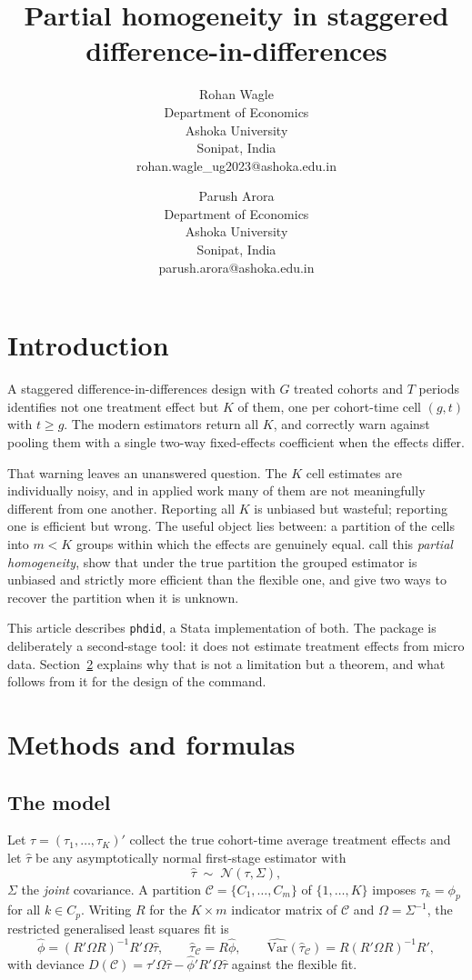 \documentclass{sj}
\title[phdid: Partial homogeneity in staggered DiD]{Partial homogeneity in
staggered difference-in-differences}
\author{Rohan Wagle\\Department of Economics\\Ashoka University\\Sonipat,
India\\rohan.wagle\_ug2023@ashoka.edu.in
\and Parush Arora\\Department of Economics\\Ashoka University\\Sonipat,
India\\parush.arora@ashoka.edu.in}
\begin{document}
\maketitle

\section{Introduction}

A staggered difference-in-differences design with $G$ treated cohorts and $T$
periods identifies not one treatment effect but $K$ of them, one per
cohort-time cell $(g,t)$ with $t \ge g$.  The modern estimators
\citep{CallawaySantAnna2021,Wooldridge2025} return all $K$, and correctly
warn against pooling them with a single two-way fixed-effects coefficient when
the effects differ.

That warning leaves an unanswered question.  The $K$ cell estimates are
individually noisy, and in applied work many of them are not meaningfully
different from one another.  Reporting all $K$ is unbiased but wasteful;
reporting one is efficient but wrong.  The useful object lies between: a
partition of the cells into $m < K$ groups within which the effects are
genuinely equal.  \citet{AroraWagle2026} call this \emph{partial homogeneity},
show that under the true partition the grouped estimator is unbiased and
strictly more efficient than the flexible one, and give two ways to recover
the partition when it is unknown.

This article describes \texttt{phdid}, a Stata implementation of both.  The
package is deliberately a second-stage tool: it does not estimate treatment
effects from micro data.  Section~\ref{sec:method} explains why that is not a
limitation but a theorem, and what follows from it for the design of the
command.

\section{Methods and formulas}
\label{sec:method}

\subsection{The model}

Let $\tau = (\tau_1,\dots,\tau_K)'$ collect the true cohort-time average
treatment effects and let $\hat\tau$ be any asymptotically normal first-stage
estimator with
\[
  \hat\tau \;\sim\; \mathcal{N}(\tau, \Sigma),
\]
$\Sigma$ the \emph{joint} covariance.  A partition $\mathcal{C} =
\{C_1,\dots,C_m\}$ of $\{1,\dots,K\}$ imposes $\tau_k = \phi_p$ for all $k \in
C_p$.  Writing $R$ for the $K \times m$ indicator matrix of $\mathcal{C}$ and
$\Omega = \Sigma^{-1}$, the restricted generalised least squares fit is
\begin{equation}
  \hat\phi = (R'\Omega R)^{-1} R'\Omega\hat\tau,
  \qquad
  \hat\tau_{\mathcal{C}} = R\hat\phi,
  \qquad
  \widehat{\mathrm{Var}}(\hat\tau_{\mathcal{C}}) = R (R'\Omega R)^{-1} R',
  \label{eq:gls}
\end{equation}
with deviance $D(\mathcal{C}) = \hat\tau'\Omega\hat\tau - \hat\phi'R'\Omega
\hat\tau$ against the flexible fit.
\end{document}
